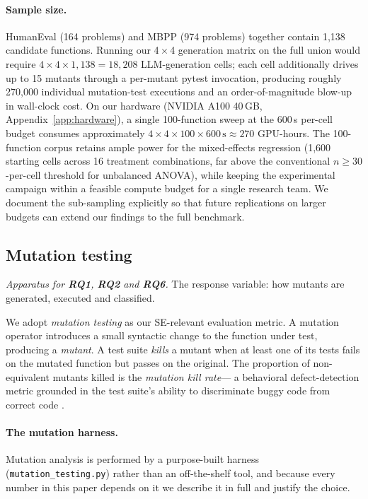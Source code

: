 \documentclass[smallextended]{svjour3}
\begin{document}
\paragraph{Sample size.}
HumanEval (164 problems) and MBPP (974 problems) together contain
1{,}138 candidate functions. Running our 4\,$\times$\,4 generation
matrix on the full union would require
$4 \times 4 \times 1{,}138 = 18{,}208$ LLM-generation cells; each
cell additionally drives up to 15 mutants through a per-mutant
pytest invocation, producing roughly 270{,}000 individual
mutation-test executions and an order-of-magnitude blow-up in
wall-clock cost. On our hardware (NVIDIA A100 40\,GB,
Appendix~\ref{app:hardware}), a single 100-function sweep at the 600\,s per-cell budget consumes approximately $4 \times 4 \times 100 \times 600\,\mathrm{s} \approx 270$ GPU-hours. The 100-function corpus retains ample power for the mixed-effects regression (1{,}600 starting cells across 16 treatment combinations, far above the conventional $n \geq 30$-per-cell threshold for unbalanced ANOVA), while
keeping the experimental campaign within a feasible compute
budget for a single research team. We document the sub-sampling
explicitly so that future replications on larger budgets can
extend our findings to the full benchmark.

\subsection{Mutation testing}\label{sec:methods-mutation}

\emph{Apparatus for \textbf{RQ1}, \textbf{RQ2} and \textbf{RQ6}.} The response
variable: how mutants are generated, executed and classified.


We adopt \emph{mutation testing} as our SE-relevant evaluation
metric. A mutation operator introduces a small syntactic change to
the function under test, producing a \emph{mutant}. A test suite
\emph{kills} a mutant when at least one of its tests fails on the
mutated function but passes on the original. The proportion of
non-equivalent mutants killed is the \emph{mutation kill rate}—
a behavioral defect-detection metric grounded in the test suite's
ability to discriminate buggy code from correct code
\citep{andrews2005,just2014}.

\paragraph{The mutation harness.} Mutation analysis is performed by
a purpose-built harness (\texttt{mutation\_testing.py}) rather than
an off-the-shelf tool, and because every number in this paper depends
on it we describe it in full and justify the choice.
\end{document}
